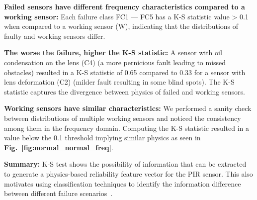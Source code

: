\noindent \textbf{Failed sensors have different frequency characteristics compared to a working sensor:} Each failure class FC1 --- FC5 has a K-S statistic value > 0.1 when compared to a working sensor (W), indicating that the distributions of faulty and working sensors differ. %

\noindent \textbf{The worse the failure, higher the K-S statistic:} A sensor with oil condensation on the lens (C4) (a more pernicious fault leading to missed obstacles) resulted in a K-S statistic of 0.65 compared to 0.33 for a sensor with lens deformation (C2) (milder fault resulting in some blind spots). The K-S statistic captures the divergence between physics of failed and working sensors.


\noindent \textbf{Working sensors have similar characteristics:} We performed a sanity check between distributions of multiple working sensors and noticed the consistency among them in the frequency domain. Computing the K-S statistic resulted in a value below the 0.1 threshold implying similar physics as seen in {\bfseries Fig.~\ref{fig:normal_normal_freq}}.



\noindent \textbf{Summary:} K-S test shows the possibility of information that can be extracted to generate a physics-based reliability feature vector for the PIR sensor. This also motivates using classification techniques to identify the information difference between different failure scenarios~\cite{breiman2001random,cunningham2020k}.

